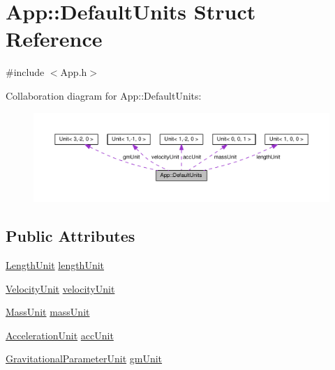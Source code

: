 \hypertarget{struct_app_1_1_default_units}{\section{App\+:\+:Default\+Units Struct Reference}
\label{struct_app_1_1_default_units}
}


{\ttfamily \#include $<$App.\+h$>$}



Collaboration diagram for App\+:\+:Default\+Units\+:\nopagebreak
\begin{figure}[H]
\begin{center}
\leavevmode
\includegraphics[width=350pt]{struct_app_1_1_default_units__coll__graph}
\end{center}
\end{figure}
\subsection*{Public Attributes}
\begin{DoxyCompactItemize}
\item 
\hyperlink{_quantity_8h_afb62d6d68e6cd2c62c96aa8c3aeb7d1f}{Length\+Unit} \hyperlink{struct_app_1_1_default_units_ad54dce1ee4af8f666579130f55034506}{length\+Unit}
\item 
\hyperlink{_quantity_8h_a4130b5cf107e9890a06c6c06bbfa7da3}{Velocity\+Unit} \hyperlink{struct_app_1_1_default_units_a828b643678f6cc966772f1cfdb74b7d5}{velocity\+Unit}
\item 
\hyperlink{_quantity_8h_a2dde25127542e6a5fcf7c085269b8963}{Mass\+Unit} \hyperlink{struct_app_1_1_default_units_a6fd33188cebaa3e473af9d9b265624da}{mass\+Unit}
\item 
\hyperlink{_quantity_8h_aa1729851532d88933ff921f24a0bce3b}{Acceleration\+Unit} \hyperlink{struct_app_1_1_default_units_a7803c87c80c03066c6d4737781edc50d}{acc\+Unit}
\item 
\hyperlink{_quantity_8h_ac250a56b26235a8dc9d44fbbeabe2024}{Gravitational\+Parameter\+Unit} \hyperlink{struct_app_1_1_default_units_a134222849fbe7070dc8a2471b8d2afb5}{gm\+Unit}
\end{DoxyCompactItemize}


